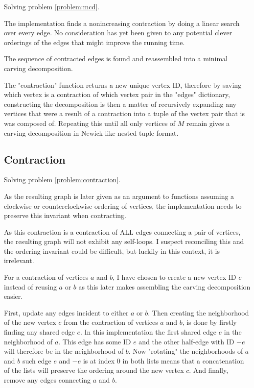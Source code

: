 \documentclass{article}
\begin{document}
		Solving problem \ref{problem:mcd}.

		The implementation finds a nonincreasing contraction by doing a linear search over every edge. No consideration has yet been given to any potential clever orderings of the edges that might improve the running time.

		The sequence of contracted edges is found and reassembled into a minimal carving decomposition.

		The "contraction" function returns a new unique vertex ID, therefore by saving which vertex is a contraction of which vertex pair in the "edges" dictionary, constructing the decomposition is then a matter of recursively expanding any vertices that were a result of a contraction into a tuple of the vertex pair that is was composed of. Repeating this until all only vertices of $M$ remain gives a carving decomposition in Newick-like nested tuple format.


	\subsection{Contraction}\label{impl:contraction}

		Solving problem \ref{problem:contraction}.

		As the resulting graph is later given as an argument to functions assuming a clockwise or counterclockwise ordering of vertices, the implementation needs to preserve this invariant when contracting.

		As this contraction is a contraction of ALL edges connecting a pair of vertices, the resulting graph will not exhibit any self-loops. I suspect reconciling this and the ordering invariant could be difficult, but luckily in this context, it is irrelevant.

		For a contraction of vertices $a$ and $b$, I have chosen to create a new vertex ID $c$ instead of reusing $a$ or $b$ as this later makes assembling the carving decomposition easier.

		First, update any edges incident to either $a$ or $b$. Then creating the neighborhood of the new vertex $c$ from the contraction of vertices $a$ and $b$, is done by firstly finding any shared edge $e$. In this implementation the first shared edge $e$ in the neighborhood of $a$. This edge has some ID $e$ and the other half-edge with ID $-e$ will therefore be in the neighborhood of $b$. Now  "rotating" the neighborhoods of $a$ and $b$ such edge $e$ and $-e$ is at index 0 in both lists means that a concatenation of the lists will preserve the ordering around the new vertex $c$. And finally, remove any edges connecting $a$ and $b$.
		
\end{document}
